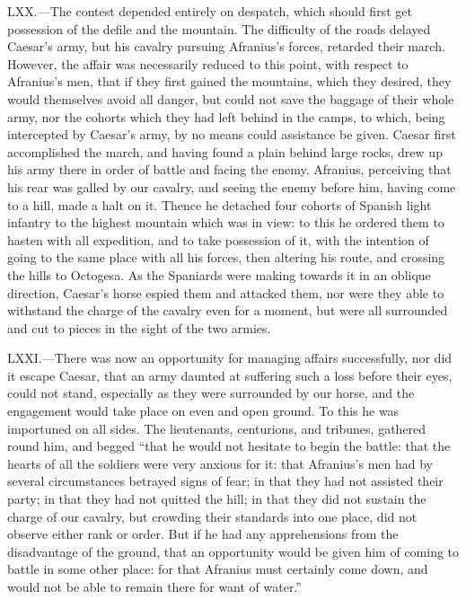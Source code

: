 LXX.—The contest depended entirely on despatch, which should first get
possession of the defile and the mountain. The difficulty of the roads
delayed Caesar's army, but his cavalry pursuing Afranius's forces,
retarded their march. However, the affair was necessarily reduced to
this point, with respect to Afranius's men, that if they first gained
the mountains, which they desired, they would themselves avoid all
danger, but could not save the baggage of their whole army, nor the
cohorts which they had left behind in the camps, to which, being
intercepted by Caesar's army, by no means could assistance be given.
Caesar first accomplished the march, and having found a plain behind
large rocks, drew up his army there in order of battle and facing the
enemy. Afranius, perceiving that his rear was galled by our cavalry, and
seeing the enemy before him, having come to a hill, made a halt on it.
Thence he detached four cohorts of Spanish light infantry to the highest
mountain which was in view: to this he ordered them to hasten with all
expedition, and to take possession of it, with the intention of going to
the same place with all his forces, then altering his route, and
crossing the hills to Octogesa. As the Spaniards were making towards it
in an oblique direction, Caesar's horse espied them and attacked them,
nor were they able to withstand the charge of the cavalry even for a
moment, but were all surrounded and cut to pieces in the sight of the
two armies.

LXXI.—There was now an opportunity for managing affairs successfully,
nor did it escape Caesar, that an army daunted at suffering such a loss
before their eyes, could not stand, especially as they were surrounded
by our horse, and the engagement would take place on even and open
ground. To this he was importuned on all sides. The lieutenants,
centurions, and tribunes, gathered round him, and begged ``that he would
not hesitate to begin the battle: that the hearts of all the soldiers
were very anxious for it: that Afranius's men had by several
circumstances betrayed signs of fear; in that they had not assisted
their party; in that they had not quitted the hill; in that they did not
sustain the charge of our cavalry, but crowding their standards into one
place, did not observe either rank or order. But if he had any
apprehensions from the disadvantage of the ground, that an opportunity
would be given him of coming to battle in some other place: for that
Afranius must certainly come down, and would not be able to remain there
for want of water.''

